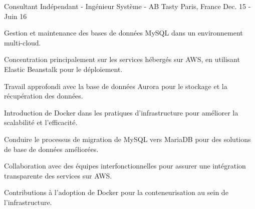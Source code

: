 \begin{cventries}
\cventry
{Consultant Indépendant - Ingénieur Système - } %
{AB Tasty} %
{Paris, France} %
{Dec. 15 - Juin 16} %
{
  \begin{cvitems} %
    \item {Gestion et maintenance des bases de données MySQL dans un environnement multi-cloud.}
    \item {Concentration principalement sur les services hébergés sur AWS, en utilisant Elastic Beanstalk pour le déploiement.}
    \item {Travail approfondi avec la base de données Aurora pour le stockage et la récupération des données.}
    \item {Introduction de Docker dans les pratiques d'infrastructure pour améliorer la scalabilité et l'efficacité.}
    \item {Conduire le processus de migration de MySQL vers MariaDB pour des solutions de base de données améliorées.}
    \item {Collaboration avec des équipes interfonctionnelles pour assurer une intégration transparente des services sur AWS.}
    \item {Contributions à l'adoption de Docker pour la conteneurisation au sein de l'infrastructure.}
  \end{cvitems}
}


\end{cventries}


